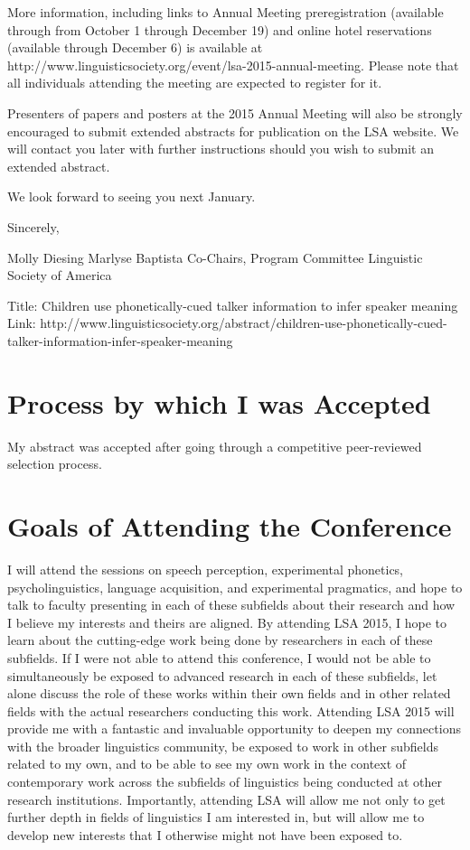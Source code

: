 \documentclass[12pt, oneside]{article}   	%
\begin{document}
{More information, including links to Annual Meeting preregistration (available through from October 1 through December 19) and online hotel reservations (available through December 6) is available at http://www.linguisticsociety.org/event/lsa-2015-annual-meeting. Please note that all individuals attending the meeting are expected to register for it.

Presenters of papers and posters at the 2015 Annual Meeting will also be strongly encouraged to submit extended abstracts for publication on the LSA website. We will contact you later with further instructions should you wish to submit an extended abstract.

We look forward to seeing you next January.

Sincerely,

Molly Diesing
Marlyse Baptista
Co-Chairs, Program Committee
Linguistic Society of America

Title: Children use phonetically-cued talker information to infer speaker meaning
Link: http://www.linguisticsociety.org/abstract/children-use-phonetically-cued-talker-information-infer-speaker-meaning}

\section{Process by which I was Accepted} My abstract was accepted after going through a competitive peer-reviewed selection process.
\section{Goals of Attending the Conference} I will attend the sessions on speech perception, experimental phonetics, psycholinguistics, language acquisition, and experimental pragmatics, and hope to talk to faculty presenting in each of these subfields about their research and how I believe my interests and theirs are aligned. By attending LSA 2015, I hope to learn about the cutting-edge work being done by researchers in each of these subfields. If I were not able to attend this conference, I would not be able to simultaneously be exposed to advanced research in each of these subfields, let alone discuss the role of these works within their own fields and in other related fields with the actual researchers conducting this work. Attending LSA 2015 will provide me with a fantastic and invaluable opportunity to deepen my connections with the broader linguistics community, be exposed to work in other subfields related to my own, and to be able to see my own work in the context of contemporary work across the subfields of linguistics being conducted at other research institutions. Importantly, attending LSA will allow me not only to get further depth in fields of linguistics I am interested in, but will allow me to develop new interests that I otherwise might not have been exposed to.
\end{document}
